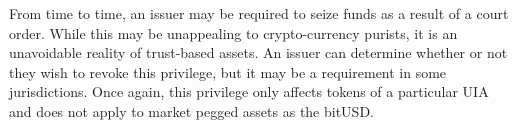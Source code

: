 From time to time, an issuer may be required to seize funds as a result of a
court order. While this may be unappealing to crypto-currency purists, it is an
unavoidable reality of trust-based assets. An issuer can determine whether or
not they wish to revoke this privilege, but it may be a requirement in some
jurisdictions. Once again, this privilege only affects tokens of a particular
UIA and does not apply to market pegged assets as the bitUSD.
